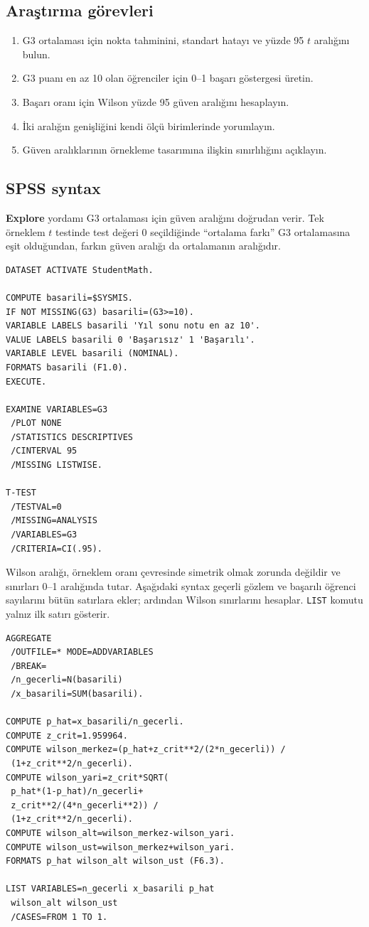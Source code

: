 \subsection{Araştırma görevleri}

\begin{enumerate}
  \item G3 ortalaması için nokta tahminini, standart hatayı ve yüzde 95 $t$ aralığını bulun.
  \item G3 puanı en az 10 olan öğrenciler için 0--1 başarı göstergesi üretin.
  \item Başarı oranı için Wilson yüzde 95 güven aralığını hesaplayın.
  \item İki aralığın genişliğini kendi ölçü birimlerinde yorumlayın.
  \item Güven aralıklarının örnekleme tasarımına ilişkin sınırlılığını açıklayın.
\end{enumerate}

\subsection{SPSS syntax}

\textbf{Explore} yordamı G3 ortalaması için güven aralığını doğrudan verir.
Tek örneklem $t$ testinde test değeri 0 seçildiğinde ``ortalama farkı'' G3
ortalamasına eşit olduğundan, farkın güven aralığı da ortalamanın aralığıdır.

\begin{lstlisting}[language={}]
DATASET ACTIVATE StudentMath.

COMPUTE basarili=$SYSMIS.
IF NOT MISSING(G3) basarili=(G3>=10).
VARIABLE LABELS basarili 'Yıl sonu notu en az 10'.
VALUE LABELS basarili 0 'Başarısız' 1 'Başarılı'.
VARIABLE LEVEL basarili (NOMINAL).
FORMATS basarili (F1.0).
EXECUTE.

EXAMINE VARIABLES=G3
 /PLOT NONE
 /STATISTICS DESCRIPTIVES
 /CINTERVAL 95
 /MISSING LISTWISE.

T-TEST
 /TESTVAL=0
 /MISSING=ANALYSIS
 /VARIABLES=G3
 /CRITERIA=CI(.95).
\end{lstlisting}

Wilson aralığı, örneklem oranı çevresinde simetrik olmak zorunda değildir ve
sınırları 0--1 aralığında tutar. Aşağıdaki syntax geçerli gözlem ve başarılı
öğrenci sayılarını bütün satırlara ekler; ardından Wilson sınırlarını hesaplar.
\texttt{LIST} komutu yalnız ilk satırı gösterir.

\begin{lstlisting}[language={}]
AGGREGATE
 /OUTFILE=* MODE=ADDVARIABLES
 /BREAK=
 /n_gecerli=N(basarili)
 /x_basarili=SUM(basarili).

COMPUTE p_hat=x_basarili/n_gecerli.
COMPUTE z_crit=1.959964.
COMPUTE wilson_merkez=(p_hat+z_crit**2/(2*n_gecerli)) /
 (1+z_crit**2/n_gecerli).
COMPUTE wilson_yari=z_crit*SQRT(
 p_hat*(1-p_hat)/n_gecerli+
 z_crit**2/(4*n_gecerli**2)) /
 (1+z_crit**2/n_gecerli).
COMPUTE wilson_alt=wilson_merkez-wilson_yari.
COMPUTE wilson_ust=wilson_merkez+wilson_yari.
FORMATS p_hat wilson_alt wilson_ust (F6.3).

LIST VARIABLES=n_gecerli x_basarili p_hat
 wilson_alt wilson_ust
 /CASES=FROM 1 TO 1.
\end{lstlisting}

